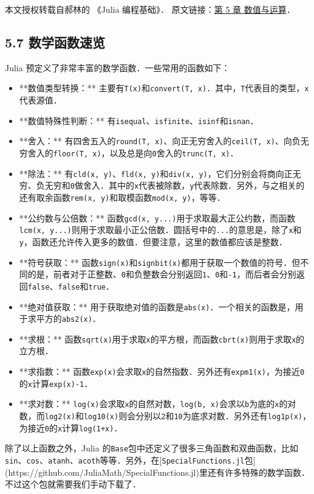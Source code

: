 
本文授权转载自郝林的 《Julia 编程基础》． 原文链接：\href{https://github.com/hyper0x/JuliaBasics/blob/master/book/ch05.md}{第 5 章 数值与运算}．


\subsection{5.7 数学函数速览}

Julia 预定义了非常丰富的数学函数．一些常用的函数如下：

\begin{itemize}
\item **数值类型转换：** 主要有\verb|T(x)|和\verb|convert(T, x)|．其中，\verb|T|代表目的类型，\verb|x|代表源值．
\item **数值特殊性判断：** 有\verb|isequal|、\verb|isfinite|、\verb|isinf|和\verb|isnan|．
\item **舍入：** 有四舍五入的\verb|round(T, x)|、向正无穷舍入的\verb|ceil(T, x)|、向负无穷舍入的\verb|floor(T, x)|，以及总是向\verb|0|舍入的\verb|trunc(T, x)|．
\item **除法：** 有\verb|cld(x, y)|、\verb|fld(x, y)|和\verb|div(x, y)|，它们分别会将商向正无穷、负无穷和\verb|0|做舍入．其中的\verb|x|代表被除数，\verb|y|代表除数．另外，与之相关的还有取余函数\verb|rem(x, y)|和取模函数\verb|mod(x, y)|，等等．
\item **公约数与公倍数：** 函数\verb|gcd(x, y...)|用于求取最大正公约数，而函数\verb|lcm(x, y...)|则用于求取最小正公倍数．圆括号中的\verb|...|的意思是，除了\verb|x|和\verb|y|，函数还允许传入更多的数值．但要注意，这里的数值都应该是整数．
\item **符号获取：** 函数\verb|sign(x)|和\verb|signbit(x)|都用于获取一个数值的符号．但不同的是，前者对于正整数、\verb|0|和负整数会分别返回\verb|1|、\verb|0|和\verb|-1|，而后者会分别返回\verb|false|、\verb|false|和\verb|true|．
\item **绝对值获取：** 用于获取绝对值的函数是\verb|abs(x)|．一个相关的函数是，用于求平方的\verb|abs2(x)|．
\item **求根：** 函数\verb|sqrt(x)|用于求取\verb|x|的平方根，而函数\verb|cbrt(x)|则用于求取\verb|x|的立方根．
\item **求指数：** 函数\verb|exp(x)|会求取\verb|x|的自然指数．另外还有\verb|expm1(x)|，为接近\verb|0|的\verb|x|计算\verb|exp(x)-1|．
\item **求对数：** \verb|log(x)|会求取\verb|x|的自然对数，\verb|log(b, x)|会求以\verb|b|为底的\verb|x|的对数，而\verb|log2(x)|和\verb|log10(x)|则会分别以\verb|2|和\verb|10|为底求对数．另外还有\verb|log1p(x)|，为接近\verb|0|的\verb|x|计算\verb|log(1+x)|．
\end{itemize}

除了以上函数之外，Julia 的\verb|Base|包中还定义了很多三角函数和双曲函数，比如\verb|sin|、\verb|cos|、\verb|atanh|、\verb|acoth|等等．另外，在[\verb|SpecialFunctions.jl|包](https://github.com/JuliaMath/SpecialFunctions.jl)里还有许多特殊的数学函数．不过这个包就需要我们手动下载了．